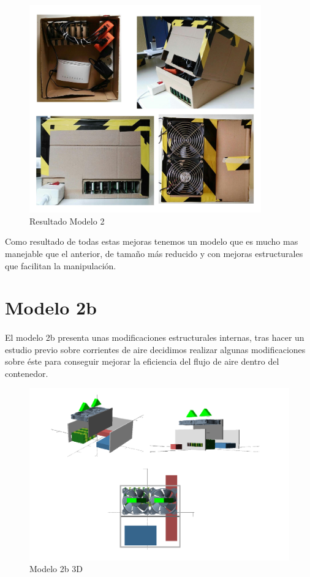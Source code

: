 \begin{figure}[H]
	\centering
  	\includegraphics[width=100mm]{Modelos/M2Res.jpg}
   	\caption[Resultado Modelo 2]{Resultado Modelo 2}
   \label{figure4.4}
\end{figure}

Como resultado de todas estas mejoras tenemos un modelo que es mucho mas manejable que el anterior, de tamaño más reducido y con mejoras estructurales que facilitan la manipulación.

\section{Modelo 2b}
\label{makereference4.5}
\paragraph{}

El modelo 2b presenta unas modificaciones estructurales internas, tras hacer un estudio previo sobre corrientes de aire decidimos realizar algunas modificaciones sobre éste para conseguir mejorar la eficiencia del flujo de aire dentro del contenedor.

\begin{figure}[H]
	\centering
  	\includegraphics[width=120mm]{Modelos/M2bX.png}
   	\caption[Modelo 2b 3D]{Modelo 2b 3D}
   \label{figure4.5}
\end{figure}

